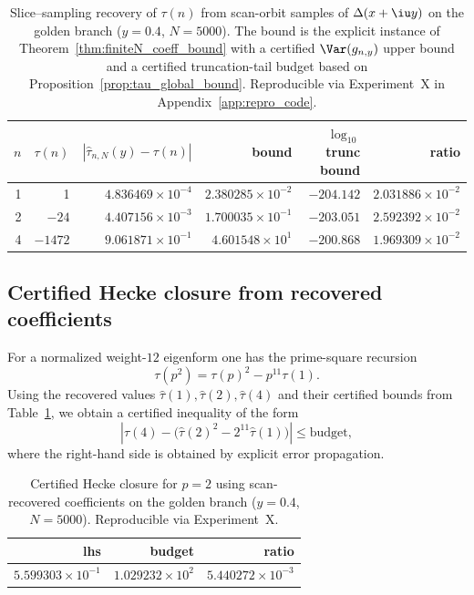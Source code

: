 \begin{table}[H]
\centering
\begin{tabular}{rrrrrr}
\toprule
$n$ & $\tau(n)$ & $|\widehat\tau_{n,N}(y)-\tau(n)|$ & bound & $\log_{10}$ trunc bound & ratio \\
\midrule
1 & 1 & $4.836469\times 10^{-4}$ & $2.380285\times 10^{-2}$ & $-204.142$ & $2.031886\times 10^{-2}$ \\
2 & $-24$ & $4.407156\times 10^{-3}$ & $1.700035\times 10^{-1}$ & $-203.051$ & $2.592392\times 10^{-2}$ \\
4 & $-1472$ & $9.061871\times 10^{-1}$ & $4.601548\times 10^{1}$ & $-200.868$ & $1.969309\times 10^{-2}$ \\
\bottomrule
\end{tabular}
\caption{Slice--sampling recovery of $\tau(n)$ from scan-orbit samples of $\Delta(x+\iu y)$ on the golden branch ($y=0.4$, $N=5000$). The bound is the explicit instance of Theorem~\ref{thm:finiteN_coeff_bound} with a certified $\Var(g_{n,y})$ upper bound and a certified truncation-tail budget based on Proposition~\ref{prop:tau_global_bound}. Reproducible via Experiment~X in Appendix~\ref{app:repro_code}.}
\label{tab:delta_tau_slice_sampling}
\end{table}

\subsection{Certified Hecke closure from recovered coefficients}
\label{app:quant_fits_tau_hecke_closure}

For a normalized weight-$12$ eigenform one has the prime-square recursion
\begin{equation}
\tau(p^2)=\tau(p)^2-p^{11}\tau(1).
\end{equation}
Using the recovered values $\widehat\tau(1),\widehat\tau(2),\widehat\tau(4)$ and their certified bounds from Table~\ref{tab:delta_tau_slice_sampling}, we obtain a certified inequality of the form
\begin{equation}
\left|\widehat\tau(4)-\big(\widehat\tau(2)^2-2^{11}\widehat\tau(1)\big)\right|\le \text{budget},
\end{equation}
where the right-hand side is obtained by explicit error propagation.

\begin{table}[H]
\centering
\begin{tabular}{rrr}
\toprule
lhs & budget & ratio \\
\midrule
$5.599303\times 10^{-1}$ & $1.029232\times 10^{2}$ & $5.440272\times 10^{-3}$ \\
\bottomrule
\end{tabular}
\caption{Certified Hecke closure for $p=2$ using scan-recovered coefficients on the golden branch ($y=0.4$, $N=5000$). Reproducible via Experiment~X.}
\label{tab:tau_hecke_certified_closure}
\end{table}


